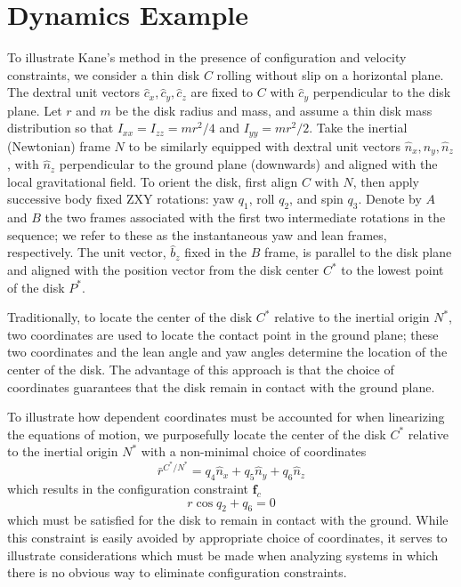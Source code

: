 \documentclass[smallcondensed,final]{svjour3}                     %
\begin{document}
\section{Dynamics Example}
\label{sec:example}
To illustrate Kane's method in the presence of configuration and velocity
constraints, we consider a thin disk $C$ rolling without slip on a horizontal
plane. The dextral unit vectors $\hat{c}_x, \hat{c}_y, \hat{c}_z$ are fixed to $C$
with $\hat{c}_y$ perpendicular to the disk plane. Let $r$ and $m$ be the
disk radius and mass, and assume a thin disk mass distribution so that
$I_{xx}=I_{zz}=mr^2/4$ and $I_{yy} = mr^2/2$. Take the inertial (Newtonian)
frame $N$ to be similarly equipped with dextral unit vectors $\hat{n}_x,
\hat{n}_y, \hat{n}_z$, with $\hat{n}_z$ perpendicular to the ground plane
(downwards) and aligned with the local gravitational field. To orient the disk,
first align $C$ with $N$, then apply successive body fixed ZXY rotations:
yaw $q_1$, roll $q_2$, and spin $q_3$.  Denote by $A$ and $B$ the two frames
associated with the first two intermediate rotations in the sequence; we refer
to these as the instantaneous yaw and lean frames, respectively. The unit
vector, $\hat{b}_z$ fixed in the $B$ frame, is parallel to the disk plane and
aligned with the position vector from the disk center $C^*$ to the lowest point
of the disk $P^*$.

Traditionally, to locate the center of the disk $C^*$
relative to the inertial origin $N^*$, two coordinates are used to locate the
contact point in the ground plane; these two coordinates and the lean angle
and yaw angles determine the location of the center of the disk. The advantage of this
approach is that the choice of coordinates guarantees that the disk remain in
contact with the ground plane.

To illustrate how dependent coordinates must be
accounted for when linearizing the equations of motion, we purposefully locate
the center of the disk $C^*$ relative to the inertial origin $N^*$ with a
non-minimal choice of coordinates
\begin{equation*}
  \bar{r}^{C^*/N^*} = q_4 \hat{n}_x + q_5 \hat{n}_y + q_6 \hat{n}_z
\end{equation*}
which results in the configuration constraint $\mathbf{f}_c$
\begin{equation}
  \label{rd:f_c}
  r\cos{q_2} + q_6 = 0
\end{equation}
which must be satisfied for the disk to remain in contact with the ground.
While this constraint is easily avoided by appropriate choice of coordinates,
it serves to illustrate considerations which must be made when analyzing
systems in which there is no obvious way to eliminate configuration constraints.
\end{document}

